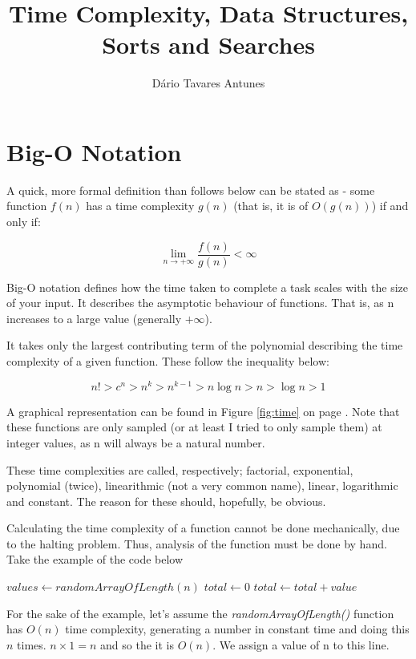 \documentclass[]{article}
\title{Time Complexity, Data Structures, Sorts and Searches}
\author{D\'{a}rio Tavares Antunes}
\date{}
\newcommand{\numberLess}[1]{
\addcontentsline{toc}{section}{#1}
\section*{#1}
}
\begin{document}
	
\maketitle

\tableofcontents

\pagebreak
{}

\numberLess{Big-O Notation}

A quick, more formal definition than follows below can be stated as - some function $f(n)$ has a time complexity $g(n)$ (that is, it is of $O(g(n))$) if and only if:

\[\lim_{n \to +\infty}\frac{f(n)}{g(n)} < \infty\]

Big-O notation defines how the time taken to complete a task scales with the size of your input. It describes the asymptotic behaviour of functions. That is, as n increases to a large value (generally $+\infty$).

It takes only the largest contributing term of the polynomial describing the time complexity of a given function. These follow the inequality below:

\[n! > c^{n} > n^{k} > n^{k-1} > n\log{n} > n > \log{n} > 1\]

A graphical representation can be found in Figure \ref{fig:time} on page \pageref{fig:time}. Note that these functions are only sampled (or at least I tried to only sample them) at integer values, as n will always be a natural number.

These time complexities are called, respectively; factorial, exponential, polynomial (twice), linearithmic (not a very common name), linear, logarithmic and constant. The reason for these should, hopefully, be obvious.

Calculating the time complexity of a function cannot be done mechanically, due to the halting problem. Thus, analysis of the function must be done by hand. Take the example of the code below

\begin{algorithmic}[1]
	\State $values \gets randomArrayOfLength(n)$
	\State $total \gets 0$
		\State $total \gets total + value$
	\EndFor
\end{algorithmic}

For the sake of the example, let's assume the \emph{randomArrayOfLength()} function has $O(n)$ time complexity, generating a number in constant time and doing this $n$ times. $n \times 1 = n$ and so the it is $O(n)$. We assign a value of n to this line.
\end{document}
